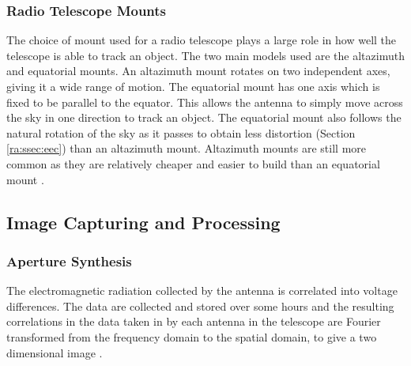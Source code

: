 \subsubsection{Radio Telescope Mounts}\label{ra:ssec:mount}
The choice of mount used for a radio telescope plays a large role in how well the telescope is able to track an object. The two main models used are the altazimuth and equatorial mounts. An altazimuth mount rotates on two independent axes, giving it a wide range of motion. The equatorial mount has one axis which is fixed to be parallel to the equator. This allows the antenna to simply move across the sky in one direction to track an object. The equatorial mount also follows the natural rotation of the sky as it passes to obtain less distortion (Section \ref{ra:ssec:eec}) than an altazimuth mount. Altazimuth mounts are still more common as they are relatively cheaper and easier to build than an equatorial mount \citep{thompson2008interferometry}.
%
\subsection{Image Capturing and Processing}\label{ra:sec:ic}
%
\subsubsection{Aperture Synthesis}\label{ra:ssec:rii}
The electromagnetic radiation collected by the antenna is correlated into voltage differences. The data are collected and stored over some hours and the resulting correlations in the data taken in by each antenna in the telescope are Fourier transformed from the frequency domain to the spatial domain, to give a two dimensional image \citep{sault1994multi}.
%
